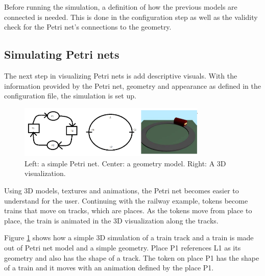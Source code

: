 Before running the simulation, a definition of how the previous models are connected is needed. This is done in the configuration step as well as the validity check for the Petri net's connections to the geometry. 

\subsection{Simulating Petri nets}
The next step in visualizing Petri nets is add descriptive visuals. With the information provided by the Petri net, geometry and appearance as defined in the configuration file, the simulation is set up.

\begin{figure}[htp]
\begin{center}
  \includegraphics[width=0.8\textwidth]{image/3steps.png}
  \caption{Left: a simple Petri net.  Center: a geometry model. Right: A 3D visualization.}
  \label{fig:3steps}
\end{center}
\end{figure}

Using 3D models, textures and animations, the Petri net becomes easier to understand for the user. Continuing with the railway example, tokens become trains that move on tracks, which are places. As the tokens move from place to place, the train is animated in the 3D visualization along the tracks.

Figure \ref{fig:3steps}  shows how a simple 3D simulation of a train track and a train is made out of Petri net model and a simple geometry. Place P1 references L1 as its geometry and also has the shape of a track. The token on place P1 has the shape of a train and it moves with an animation defined by the place P1.